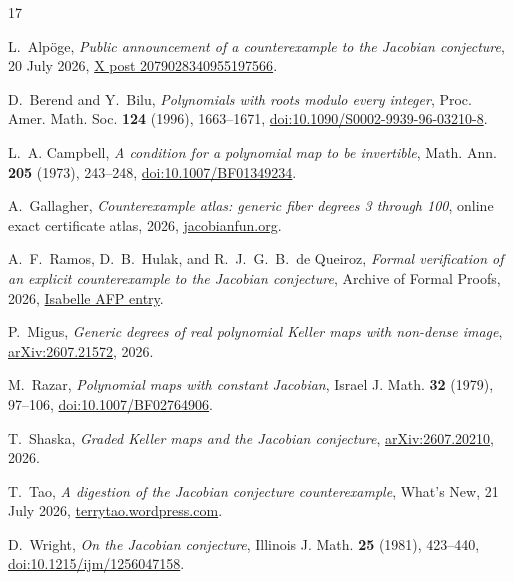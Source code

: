 \begin{thebibliography}{17}
\footnotesize
\setlength{\itemsep}{0pt}

L.~Alp\"oge,
\emph{Public announcement of a counterexample to the Jacobian conjecture},
20 July 2026,
\href{https://x.com/__alpoge__/status/2079028340955197566}
{X post 2079028340955197566}.

D.~Berend and Y.~Bilu,
\emph{Polynomials with roots modulo every integer},
Proc. Amer. Math. Soc. \textbf{124} (1996), 1663--1671,
\href{https://doi.org/10.1090/S0002-9939-96-03210-8}
{doi:10.1090/S0002-9939-96-03210-8}.

L.~A. Campbell,
\emph{A condition for a polynomial map to be invertible},
Math. Ann. \textbf{205} (1973), 243--248,
\href{https://doi.org/10.1007/BF01349234}
{doi:10.1007/BF01349234}.

A.~Gallagher,
\emph{Counterexample atlas: generic fiber degrees 3 through 100},
online exact certificate atlas, 2026,
\href{https://jacobianfun.org/counterexamples}{jacobianfun.org}.

A.~F.~Ramos, D.~B.~Hulak, and R.~J.~G.~B.~de Queiroz,
\emph{Formal verification of an explicit counterexample to the Jacobian
conjecture},
Archive of Formal Proofs, 2026,
\href{https://isa-afp.org/entries/Jacobian_Counterexample.html}
{Isabelle AFP entry}.

P.~Migus,
\emph{Generic degrees of real polynomial Keller maps with non-dense image},
\href{https://arxiv.org/abs/2607.21572}{arXiv:2607.21572}, 2026.

M.~Razar,
\emph{Polynomial maps with constant Jacobian},
Israel J. Math. \textbf{32} (1979), 97--106,
\href{https://doi.org/10.1007/BF02764906}
{doi:10.1007/BF02764906}.

T.~Shaska,
\emph{Graded Keller maps and the Jacobian conjecture},
\href{https://arxiv.org/abs/2607.20210}{arXiv:2607.20210}, 2026.

T.~Tao,
\emph{A digestion of the Jacobian conjecture counterexample},
What's New, 21 July 2026,
\href{https://terrytao.wordpress.com/2026/07/21/a-digestion-of-the-jacobian-conjecture-counterexample/}
{terrytao.wordpress.com}.

D.~Wright,
\emph{On the Jacobian conjecture},
Illinois J. Math. \textbf{25} (1981), 423--440,
\href{https://doi.org/10.1215/ijm/1256047158}
{doi:10.1215/ijm/1256047158}.


\end{thebibliography}
